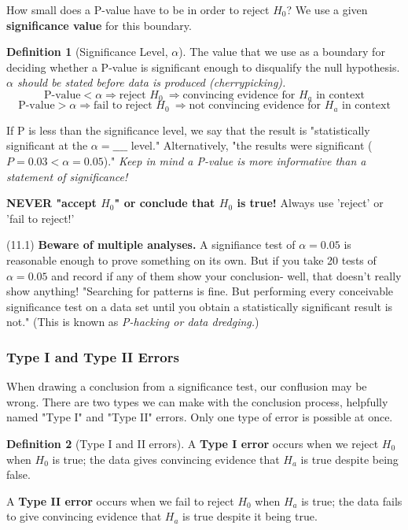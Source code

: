 \documentclass[12pt, a4paper]{article}
\theoremstyle{definition}
\newtheorem{definition}{Definition}
\begin{document}
How small does a P-value have to be in order to reject $H_0$? We use a given \textbf{significance value} for this boundary.

\begin{definition}[Significance Level, $\alpha$]
    The value that we use as a boundary for deciding whether a P-value is significant enough to disqualify the null hypothesis. \textit{$\alpha$ should be stated before data is produced (cherrypicking).}
    \[\textrm{P-value} < \alpha \Rightarrow \textrm{reject } H_0\ \Rightarrow \textrm{convincing evidence for $H_a$ in context}\]
    \[\textrm{P-value} > \alpha \Rightarrow \textrm{fail to reject } H_0\ \Rightarrow \textrm{not convincing evidence for $H_a$ in context}\]
\end{definition}

If P is less than the significance level, we say that the result is "statistically significant at the $\alpha = \_\_\_\_$ level."
Alternatively, "the results were significant ($P = 0.03 < \alpha = 0.05$)."
\textit{Keep in mind a P-value is more informative than a statement of significance!}

\textbf{NEVER "accept $H_0$" or conclude that $H_0$ is true!} Always use 'reject' or 'fail to reject!'

(11.1) \textbf{Beware of multiple analyses.} A signifiance test of $\alpha = 0.05$ is reasonable enough to prove something on its own.
But if you take 20 tests of $\alpha = 0.05$ and record if any of them show your conclusion- well, that doesn't really show anything! "Searching for patterns is fine. But performing every conceivable significance test on a data set until you obtain a statistically significant result is not."
(This is known as \textit{P-hacking or data dredging.})

\subsubsection{Type I and Type II Errors}
When drawing a conclusion from a significance test, our conflusion may be wrong.
There are two types we can make with the conclusion process, helpfully named "Type I" and "Type II" errors. Only one type of error is possible at once.

\begin{definition}[Type I and II errors]
    A \textbf{Type I error} occurs when we reject $H_0$ when $H_0$ is true; the data gives convincing evidence that $H_a$ is true despite being false.
    
    A \textbf{Type II error} occurs when we fail to reject $H_0$ when $H_a$ is true; the data fails to give convincing evidence that $H_a$ is true despite it being true.
\end{definition}
\end{document}
